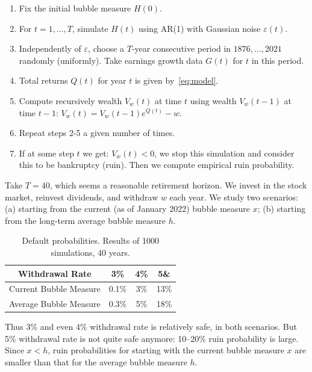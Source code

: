 \documentclass[12pt]{amsart}
\theoremstyle{definition}
\begin{document}
\begin{enumerate}
\item Fix the initial bubble measure $H(0)$.

\item For $t = 1, \ldots, T$, simulate $H(t)$ using AR(1) with Gaussian noise $\varepsilon(t)$. 

\item Independently of $\varepsilon$, choose a $T$-year consecutive period in $1876, \ldots, 2021$ randomly (uniformly). Take earnings growth data $G(t)$ for $t$ in this period. 

\item Total returns $Q(t)$ for year $t$ is given by~\eqref{eq:model}.

\item Compute recursively wealth $V_w(t)$ at time $t$ using wealth $V_w(t-1)$ at time $t-1$: $V_w(t) = V_w(t-1)e^{Q(t)} - w$. 

\item Repeat steps 2-5 a given number of times. 

\item If at some step $t$ we get: $V_w(t) < 0$, we stop this simulation and consider this to be bankruptcy (ruin). Then we compute empirical ruin probability. 
\end{enumerate}

Take $T = 40$, which seems a reasonable retirement horizon. We invest in the stock market, reinvest dividends, and withdraw $w$ each year. We study two scenarios: (a) starting from the current (as of January 2022) bubble measure $x$; (b) starting from the long-term average bubble measure $h$. 

\begin{table}
\begin{tabular}{|c||c|c|c||}
\hline
\hline
Withdrawal Rate & 3\% & 4\% & 5\& \\
\hline
\hline
Current Bubble Measure & 0.1\% & 3\% & 13\% \\
\hline 
Average Bubble Measure & 0.3\% & 5\% & 18\% \\
\hline
\hline
\end{tabular}
\bigskip
\caption{Default probabilities. Results of 1000 simulations, 40 years.}
\end{table}

Thus 3\% and even 4\% withdrawal rate is relatively safe, in both scenarios. But 5\% withdrawal rate is not quite safe anymore: 10--20\% ruin probability is large.  Since $x < h$, ruin probabilities for starting with the current bubble measure $x$ are smaller than that for the average bubble measure $h$. 
\end{document}

